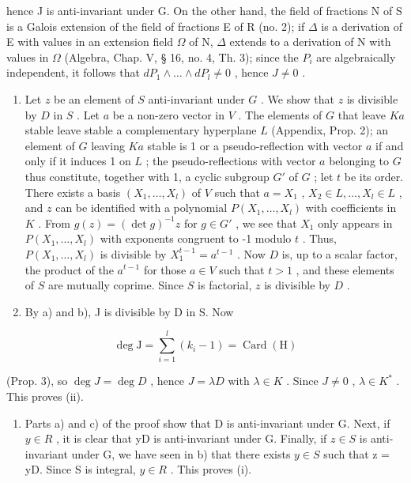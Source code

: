 hence J is anti-invariant under G. On the other hand, the field of fractions N of S is a Galois extension of the field of fractions E of R (no. 2); if \(\Delta\) is a derivation of E with values in an extension field \(\Omega\) of N, \(\Delta\) extends to a derivation of N with values in \(\Omega\) (Algebra, Chap. V, § 16, no. 4, Th. 3); since the \(P_{i}\) are algebraically independent, it follows that \(dP_{1} \wedge \ldots \wedge dP_{l} \neq 0\) , hence \(J \neq 0\) .

\begin{enumerate}
\def\labelenumi{\alph{enumi})}
\setcounter{enumi}{1}
\item
  Let \(z\) be an element of \(S\) anti-invariant under \(G\) . We show that \(z\) is divisible by \(D\) in \(S\) . Let \(a\) be a non-zero vector in \(V\) . The elements of \(G\) that leave \(Ka\) stable leave stable a complementary hyperplane \(L\) (Appendix, Prop. 2); an element of \(G\) leaving \(Ka\) stable is 1 or a pseudo-reflection with vector \(a\) if and only if it induces 1 on \(L\) ; the pseudo-reflections with vector \(a\) belonging to \(G\) thus constitute, together with 1, a cyclic subgroup \(G'\) of \(G\) ; let \(t\) be its order. There exists a basis \((X_1, \ldots, X_l)\) of \(V\) such that \(a = X_1\) , \(X_2 \in L, \ldots, X_l \in L\) , and \(z\) can be identified with a polynomial \(P(X_1, \ldots, X_l)\) with coefficients in \(K\) . From \(g(z) = (\det g)^{-1}z\) for \(g \in G'\) , we see that \(X_1\) only appears in \(P(X_1, \ldots, X_l)\) with exponents congruent to -1 modulo \(t\) . Thus, \(P(X_1, \ldots, X_l)\) is divisible by \(X_1^{t-1} = a^{t-1}\) . Now \(D\) is, up to a scalar factor, the product of the \(a^{t-1}\) for those \(a \in V\) such that \(t > 1\) , and these elements of \(S\) are mutually coprime. Since \(S\) is factorial, \(z\) is divisible by \(D\) .
\item
  By a) and b), J is divisible by D in S. Now
\end{enumerate}

\[
\deg \mathrm{J} = \sum_ {i = 1} ^ {l} (k _ {i} - 1) = \operatorname{Card} (\mathrm{H})
\]

(Prop. 3), so \(\deg J = \deg D\) , hence \(J = \lambda D\) with \(\lambda \in K\) . Since \(J \neq 0\) , \(\lambda \in K^*\) . This proves (ii).

\begin{enumerate}
\def\labelenumi{\alph{enumi})}
\setcounter{enumi}{3}
\tightlist
\item
  Parts a) and c) of the proof show that D is anti-invariant under G. Next, if \(y \in R\) , it is clear that yD is anti-invariant under G. Finally, if \(z \in S\) is anti-invariant under G, we have seen in b) that there exists \(y \in S\) such that z = yD. Since S is integral, \(y \in R\) . This proves (i).
\end{enumerate}
\relax{}
